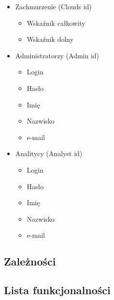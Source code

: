 \documentclass[12pt,a4paper]{article}
\begin{document}
\begin{itemize}
\begin{itemize}
    \end{itemize}
\item Zachmurzenie (Clouds id)
	\begin{itemize}
	\item Wskaźnik całkowity
	\item Wskaźnik dolny
	\end{itemize}
\item Administratorzy (Admin id)
    \begin{itemize}
    \item Login
    \item Hasło
    \item Imię
    \item Nazwisko
    \item e-mail
    \end{itemize}
\item Analitycy (Analyst id)
    \begin{itemize}
    \item Login
    \item Hasło
    \item Imię
    \item Nazwisko
    \item e-mail
    \end{itemize}
\end{itemize}
 
\subsection{Zależności}
\newpage
\subsection{Lista funkcjonalności}
\begin{table}[!htb]
\centering
\caption{Poziomy kompetencji klientów} 
\end{table}
\end{document}
